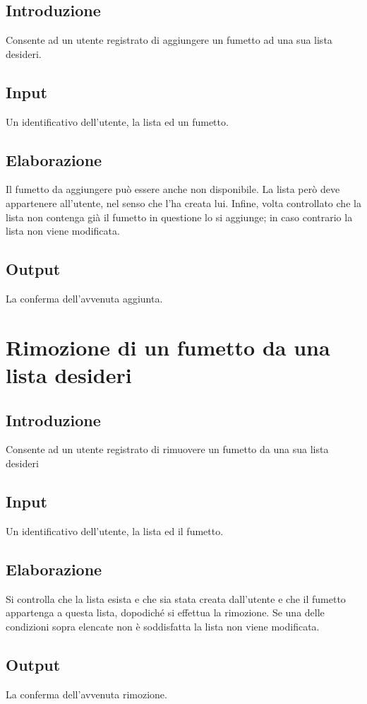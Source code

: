 \documentclass{scrreprt}
\begin{document}
\subsection*{Introduzione}
Consente ad un utente registrato di aggiungere un fumetto ad una sua lista desideri.
\subsection*{Input}
Un identificativo dell'utente, la lista ed un fumetto.
\subsection*{Elaborazione}
Il fumetto da aggiungere può essere anche non disponibile. La lista però deve appartenere all'utente, nel
senso che l'ha creata lui.
Infine, volta controllato che la lista non contenga già il fumetto in questione lo si aggiunge; in caso
contrario la lista non viene modificata.
\subsection*{Output}
La conferma dell'avvenuta aggiunta.

\section{Rimozione di un fumetto da una lista desideri}

\subsection*{Introduzione}
Consente ad un utente registrato di rimuovere un fumetto da una sua lista desideri
\subsection*{Input}
Un identificativo dell'utente, la lista ed il fumetto.
\subsection*{Elaborazione}
Si controlla che la lista esista e che sia stata creata dall'utente e che il fumetto appartenga a questa lista,
dopodiché si effettua la rimozione. Se una delle condizioni sopra elencate non è soddisfatta la lista non viene modificata.
\subsection*{Output}
La conferma dell'avvenuta rimozione.
\end{document}
